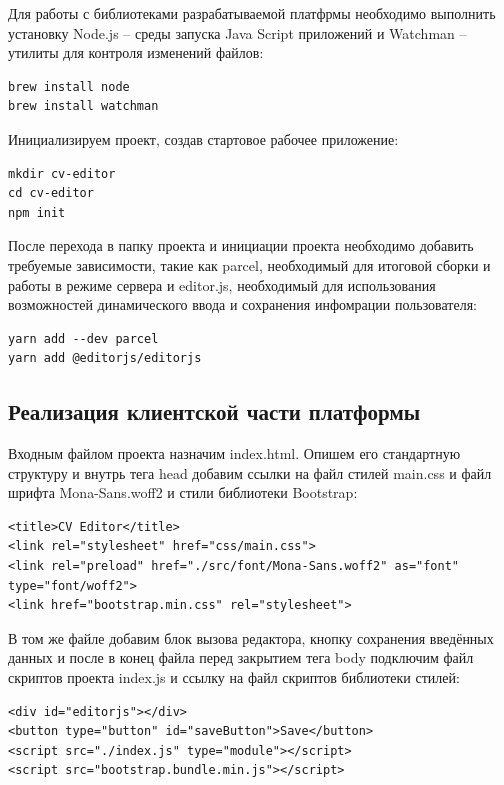 \documentclass[master, och, diploma]{SCWorks}
\begin{document}
Для работы с библиотеками разрабатываемой платфрмы необходимо выполнить установку Node.js – среды запуска Java Script приложений и Watchman – утилиты для контроля изменений файлов:
\begin{verbatim}
brew install node
brew install watchman
\end{verbatim}


Инициализируем проект, создав стартовое рабочее приложение:
\begin{verbatim}
mkdir cv-editor
cd cv-editor
npm init
\end{verbatim}


После перехода в папку проекта и инициации проекта необходимо добавить требуемые зависимости, такие как parcel, необходимый для итоговой сборки и работы в режиме сервера и editor.js, необходимый для использования возможностей динамического ввода и сохранения инфомрации пользователя:
\begin{verbatim}
yarn add --dev parcel
yarn add @editorjs/editorjs
\end{verbatim}


\subsection{Реализация клиентской части платформы}
Входным файлом проекта назначим index.html. Опишем его стандартную структуру и внутрь тега head добавим ссылки на файл стилей main.css и файл шрифта Mona-Sans.woff2 и стили библиотеки Bootstrap:
\begin{verbatim}
<title>CV Editor</title>
<link rel="stylesheet" href="css/main.css">
<link rel="preload" href="./src/font/Mona-Sans.woff2" as="font" type="font/woff2">
<link href="bootstrap.min.css" rel="stylesheet">
\end{verbatim}


В том же файле добавим блок вызова редактора, кнопку сохранения введённых данных и после в конец файла перед закрытием тега body подключим файл скриптов проекта index.js и ссылку на файл скриптов библиотеки стилей:
\begin{verbatim}
<div id="editorjs"></div>
<button type="button" id="saveButton">Save</button>
<script src="./index.js" type="module"></script>
<script src="bootstrap.bundle.min.js"></script>
\end{verbatim}
\end{document}
